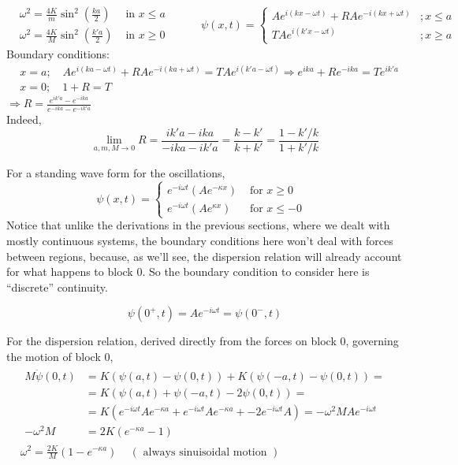 \documentclass[twoside,10pt]{amsart}
\newcommand{\problemhead}[1]
  {\smallskip
   \noindent{\large\bf Problem #1.}
   \smallskip}
\begin{document}
\problemhead{9.1} 
\[
\begin{aligned}
  & \omega^2 = \frac{4K}{m} \sin^2{\left( \frac{ka}{2} \right) } & \text{ in $x \leq a$ } \\
  & \omega^2 = \frac{4K}{M} \sin^2{\left( \frac{k'a}{2} \right) } & \text{ in $x \geq 0$ } 
\end{aligned} \quad \quad \, 
\psi(x,t) = \begin{cases}
  A e^{i (kx- \omega t)} + RA e^{-i(kx + \omega t)} & ; x \leq a \\
  T A e^{i (k'x- \omega t)}  & ; x \geq a 
\end{cases}
\]
Boundary conditions: 
\[
\begin{aligned}
  & x=a;  \quad A e^{ i (ka - \omega t)} + RA e^{-i(ka +\omega t) } = TA e^{i (k'a - \omega t) } \Longrightarrow e^{ika} + Re^{-ika} = T e^{ik'a} \\
  & x = 0;  \quad 1+R = T 
\end{aligned}
\]
$\Longrightarrow R = \frac{ e^{ik'a} - e^{-ika} }{ e^{-ika} - e^{-ik'a} }$ \medskip \\

Indeed,
\[
\lim_{a,m,M\to 0} R = \frac{ ik'a - ika}{-ika - ik'a} = \frac{ k-k'}{k+k'} = \frac{ 1-  k'/k}{1+k'/k}
\]

\problemhead{9.2}
For a standing wave form for the oscillations,
\[
\psi(x,t) = \begin{cases} 
  e^{-i \omega t} (Ae^{-\kappa x} ) & \text{ for $x \geq 0$ } \\
  e^{-i \omega t} (Ae^{\kappa x }) & \text{ for $x \leq -0$ }
\end{cases}
\]
Notice that unlike the derivations in the previous sections, where we dealt with mostly continuous systems, the boundary conditions here won't deal with forces between regions, because, as we'll see, the dispersion relation will already account for what happens to block $0$.  So the boundary condition to consider here is ``discrete'' continuity.  

\[
\psi(0^+,t) = Ae^{-i\omega t} = \psi(0^-,t)
\]

For the dispersion relation, derived directly from the forces on block $0$, governing the motion of block $0$, 
\[
\begin{gathered}
  \begin{aligned}
  M\ddot{\psi}(0,t) & = K (\psi(a,t) - \psi(0,t)) + K(\psi(-a,t) - \psi(0,t) )  = \\
  & = K(\psi(a,t) + \psi(-a,t) - 2\psi(0,t) ) = \\
  & = K ( e^{-i \omega t} A e^{-\kappa a} + e^{-i\omega t} Ae^{-\kappa a} + -2 e^{-i\omega t} A ) = - \omega^2 M Ae^{ -i \omega t} \\
  - \omega^2 M & = 2K (e^{-\kappa a} - 1 ) 
  \end{aligned} \\
  \omega^2 = \frac{2K}{M} (1- e^{-\kappa a} ) \quad \, (\text{ always sinuisoidal motion } )
\end{gathered}
\]
\end{document}
